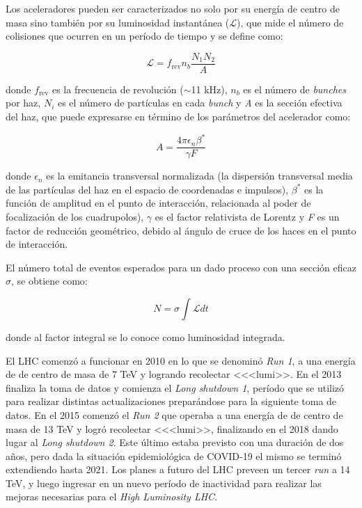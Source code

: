 Los aceleradores pueden ser caracterizados no solo por su energía de centro de masa sino también por su luminosidad instantánea ($\mathcal{L}$), que mide el número de colisiones que ocurren en un período de tiempo y se define como: 

\begin{equation}
\mathcal{L}=f_{\text{rev}}n_{b}\frac{N_{1}N_{2}}{A}
\end{equation}

\noindent
donde $f_{\text{rev}}$ es la frecuencia de revolución ($\sim$11 kHz), $n_{b}$ es el número de \textit{bunches} por haz, $N_{i}$ es el número de partículas en cada \textit{bunch} y \textit{A} es la sección efectiva del haz, que puede expresarse en término de los parámetros del acelerador como:

\begin{equation}
A=\frac{4 \pi \epsilon_{n}\beta^{*}}{\gamma F}
\end{equation} 

\noindent
donde $\epsilon_{n}$ es la emitancia transversal normalizada (la dispersión transversal media de las partículas del  haz en el espacio de coordenadas e impulsos), $\beta^{*}$ es la función de amplitud en el punto de interacción, relacionada al poder de focalización de los cuadrupolos), $\gamma$ es el factor relativista de Lorentz y \textit{F} es un factor de reducción geométrico, debido al ángulo de cruce de los haces en el punto de interacción.

El número total de eventos esperados para un dado proceso con una sección eficaz $\sigma$, se obtiene como:

\begin{equation}
N=\sigma \int \mathcal{L} dt
\end{equation}	

\noindent
donde al factor integral se lo conoce como luminosidad integrada.

El LHC comenzó a funcionar en 2010 en lo que se denominó \textit{Run 1}, a una energía de de centro de masa de 7 TeV y logrando recolectar <<<lumi>>. En el 2013 finaliza la toma de datos y comienza el \textit{Long shutdown 1}, período que se utilizó para realizar distintas actualizaciones preparándose para la siguiente toma de datos. En el 2015 comenzó el \textit{Run 2} que operaba a una energía de de centro de masa de 13 TeV y logró recolectar <<<lumi>>, finalizando en el 2018 dando lugar al \textit{Long shutdown 2}. Este último estaba previsto con una duración de dos años, pero dada la situación epidemiológica de COVID-19 el mismo se terminó extendiendo hasta 2021.
Los planes a futuro del LHC preveen un tercer \textit{run} a 14 TeV, y luego ingresar en un nuevo período de inactividad para realizar las mejoras necesarias para el \textit{High Luminosity LHC}.






